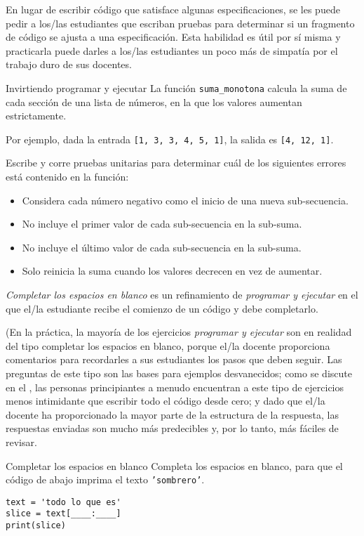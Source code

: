En lugar de escribir código que satisface algunas especificaciones,  
se les puede pedir a los/las estudiantes que escriban pruebas para determinar si un fragmento de código se ajusta a una especificación. 
Esta habilidad es útil por sí misma y practicarla puede darles a los/las estudiantes un poco más de simpatía por el trabajo duro de sus docentes.

\begin{aside}{Invirtiendo programar y ejecutar}
 La función \texttt{suma\_monotona} calcula la suma de cada sección de una lista de números, en la que los valores aumentan estrictamente.

Por ejemplo,
  dada la entrada \texttt{[1,\ 3,\ 3,\ 4,\ 5,\ 1]},
  la salida es  \texttt{[4,\ 12,\ 1]}.

Escribe y corre pruebas unitarias para determinar cuál de los siguientes errores está contenido en la función:

   \begin{itemize}
  \item
    Considera cada número negativo como el inicio de una nueva sub-secuencia.
  \item
    No incluye el primer valor de cada sub-secuencia en la sub-suma.
  \item
    No incluye el último valor de cada sub-secuencia en la sub-suma.
  \item
    Solo reinicia la suma cuando los valores decrecen en vez de aumentar.
  \end{itemize}
\end{aside}


\emph{Completar los espacios en blanco} es un refinamiento de \emph{programar y ejecutar}
en el que el/la estudiante recibe el comienzo de un código y debe completarlo.

(En la práctica, la mayoría de los ejercicios \emph{programar y ejecutar} son en realidad del tipo completar los espacios en blanco, porque el/la docente proporciona comentarios
para recordarles a sus estudiantes los pasos que deben seguir. 
Las preguntas de este tipo son las bases para ejemplos desvanecidos;
como se discute en el ,
las personas principiantes a menudo encuentran a este tipo de ejercicios  menos intimidante que escribir todo el código desde cero;
y dado que el/la docente ha proporcionado la mayor parte de la estructura de la respuesta,
las respuestas enviadas son mucho más predecibles y, por lo tanto, más fáciles de revisar.

\begin{aside}{Completar los espacios en blanco}
 Completa los espacios en blanco,
 para que el código de abajo imprima el texto  \texttt{'sombrero'}.

\begin{verbatim}
text = 'todo lo que es'
slice = text[____:____]
print(slice)
\end{verbatim}
\end{aside}

